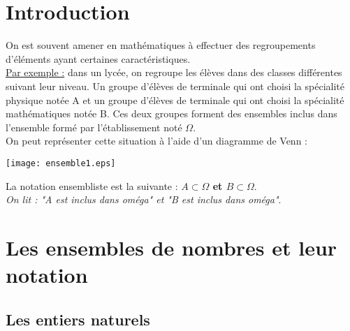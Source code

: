 \documentclass[a4paper,14pt,twoside,french]{extarticle}
\begin{document}
\setcounter{page}{0}

\begin{minipage}{.9\textwidth}

\renewcommand{\contentsname}{\sffamily Plan du cours}

\large

\tableofcontents

\end{minipage}
\newpage
 \setcounter{page}{1}
 

 \section{Introduction}
 
 On est souvent amener en mathématiques à effectuer des regroupements d'éléments ayant certaines caractéristiques.\\
 
\underline{Par exemple :} dans un lycée, on regroupe les élèves dans des classes différentes suivant leur niveau. Un groupe d'élèves de terminale qui ont choisi la spécialité physique notée A et un groupe d'élèves de terminale qui ont choisi la spécialité mathématiques notée B. Ces deux groupes forment des ensembles inclus dans l'ensemble formé par l'établissement noté $\Omega$. \\

On peut représenter cette situation à l'aide d'un diagramme de Venn :

\begin{center}
\texttt{[image: ensemble1.eps]} 
\end{center}


La notation ensembliste est la suivante : \textbf{$A \subset \Omega$ et $B \subset \Omega$}.\\
\hspace*{3cm} \textit{On lit : "A est inclus dans oméga" et "B est inclus dans oméga"}.\\

\vspace*{1.30cm}

\section{Les ensembles de nombres et leur notation}



\subsection{Les entiers naturels}
\end{document}

